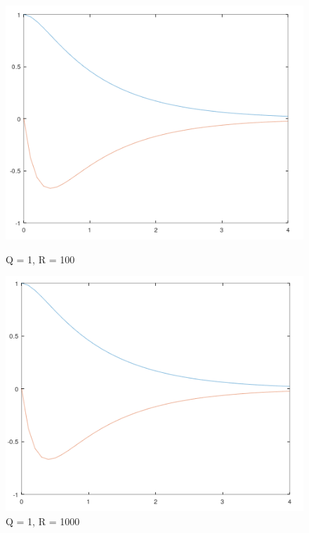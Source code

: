 \documentclass{jsarticle}
\begin{document}
\begin{figure}[h!]
  \centering
  \begin{minipage}{0.325\linewidth}
    \centering
    \includegraphics[width=\linewidth]{./fig/q1_r100.png}
    \caption{Q = 1, R = 100}
  \end{minipage}
  \hfill
  \begin{minipage}{0.325\linewidth}
    \centering
    \includegraphics[width=\linewidth]{./fig/q1_r1000.png}
    \caption{Q = 1, R = 1000}
  \end{minipage}
  \hfill
  \begin{minipage}{0.325\linewidth}
    \centering

\end{minipage}
\end{figure}
\end{document}
